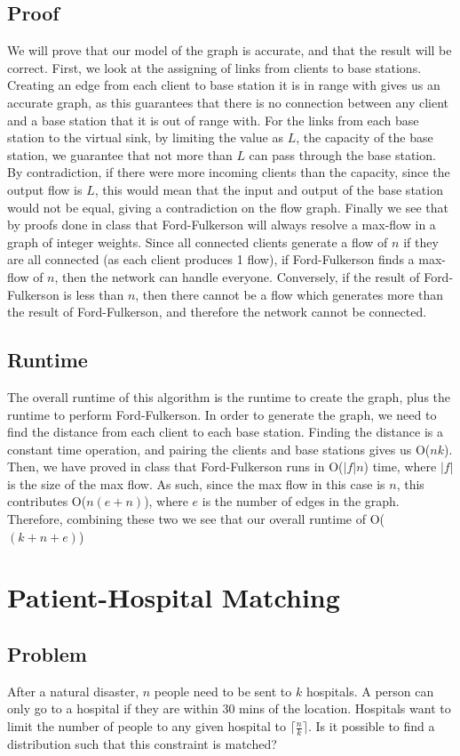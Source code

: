 \documentclass[titlepage]{article}
\begin{document}
\subsection{Proof}
We will prove that our model of the graph is accurate, and that the result will be correct. First, we look at the assigning of links from
clients to base stations. Creating an edge from each client to base station it is in range with gives us an accurate graph, as this guarantees
that there is no connection between any client and a base station that it is out of range with. For the links from each base station to the
virtual sink, by limiting the value as $L$, the capacity of the base station, we guarantee that not more than $L$ can pass through the
base station. By contradiction, if there were more incoming clients than the capacity, since the output flow is $L$, this would mean that
the input and output of the base station would not be equal, giving a contradiction on the flow graph. Finally we see that by proofs done
in class that Ford-Fulkerson will always resolve a max-flow in a graph of integer weights. Since all connected clients generate a flow of
$n$ if they are all connected (as each client produces 1 flow), if Ford-Fulkerson finds a max-flow of $n$, then the network can handle everyone.
Conversely, if the result of Ford-Fulkerson is less than $n$, then there cannot be a flow which generates more than the result of Ford-Fulkerson,
and therefore the network cannot be connected.
\subsection{Runtime}
The overall runtime of this algorithm is the runtime to create the graph, plus the runtime to perform Ford-Fulkerson. In order to generate the
graph, we need to find the distance from each client to each base station. Finding the distance is a constant time operation, and pairing the
clients and base stations gives us O($nk$). Then, we have proved in class that Ford-Fulkerson runs in O($|f|n$) time, where $|f|$ is the size
of the max flow. As such, since the max flow in this case is $n$, this contributes O($n(e+n)$), where $e$ is the number of edges in the graph.
Therefore, combining these two we see that our overall runtime of O($(k+n+e)$)
\section{Patient-Hospital Matching}
\subsection{Problem}
After a natural disaster, $n$ people need to be sent to $k$ hospitals. A person can only go to a hospital if they are within 30 mins of the
location. Hospitals want to limit the number of people to any given hospital to $\lceil\frac{n}{k}\rceil$. Is it possible to find a
distribution such that this constraint is matched?
\end{document}
